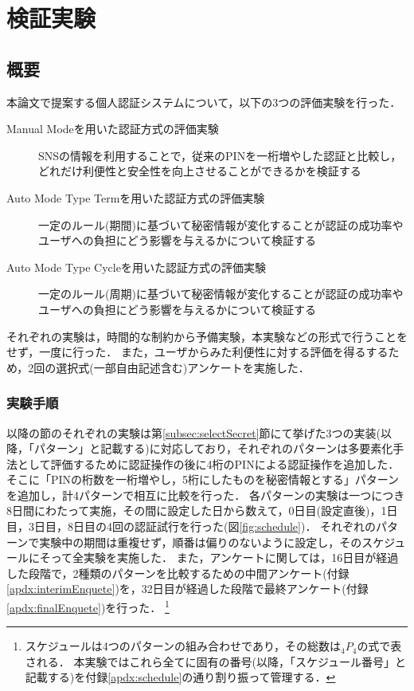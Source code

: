\chapter{検証実験}\label{chap:experiment}

\section{概要}
本論文で提案する個人認証システムについて，以下の3つの評価実験を行った．
\begin{description}
  \item[Manual Modeを用いた認証方式の評価実験] SNSの情報を利用することで，従来のPINを一桁増やした認証と比較し，どれだけ利便性と安全性を向上させることができるかを検証する
  \item[Auto Mode Type Termを用いた認証方式の評価実験] 一定のルール(期間)に基づいて秘密情報が変化することが認証の成功率やユーザへの負担にどう影響を与えるかについて検証する
  \item[Auto Mode Type Cycleを用いた認証方式の評価実験] 一定のルール(周期)に基づいて秘密情報が変化することが認証の成功率やユーザへの負担にどう影響を与えるかについて検証する
\end{description}
それぞれの実験は，時間的な制約から予備実験，本実験などの形式で行うことをせず，一度に行った．
また，ユーザからみた利便性に対する評価を得るするため，2回の選択式(一部自由記述含む)アンケートを実施した．

\subsection{実験手順}
以降の節のそれぞれの実験は第\ref{subsec:selectSecret}節にて挙げた3つの実装(以降，「パターン」と記載する)に対応しており，それぞれのパターンは多要素化手法として評価するために認証操作の後に4桁のPINによる認証操作を追加した．
そこに「PINの桁数を一桁増やし，5桁にしたものを秘密情報とする」パターンを追加し，計4パターンで相互に比較を行った．
各パターンの実験は一つにつき8日間にわたって実施，その間に設定した日から数えて，0日目(設定直後)，1日目，3日目，8日目の4回の認証試行を行った(図\ref{fig:schedule})．
それぞれのパターンで実験中の期間は重複せず，順番は偏りのないように設定し，そのスケジュールにそって全実験を実施した．
また，アンケートに関しては，16日目が経過した段階で，2種類のパターンを比較するための中間アンケート(付録\ref{apdx:interimEnquete})を，32日目が経過した段階で最終アンケート(付録\ref{apdx:finalEnquete})を行った．
\footnote{スケジュールは4つのパターンの組み合わせであり，その総数は$ {}_4 P _4 $の式で表される．
本実験ではこれら全てに固有の番号(以降，「スケジュール番号」と記載する)を付録\ref{apdx:schedule}の通り割り振って管理する．}

